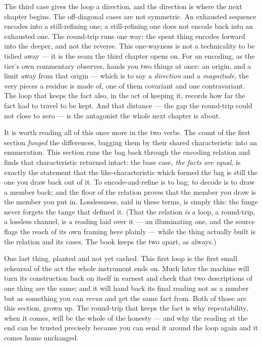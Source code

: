 The third case gives the loop a direction, and the direction is where the next chapter begins. The off-diagonal cases
are not symmetric. An exhausted sequence encodes into a still-refining one; a still-refining one does not encode back
into an exhausted one. The round-trip runs one way: the spent thing encodes forward into the deeper, and not the
reverse. This one-wayness is not a technicality to be tidied away --- it is the seam the third chapter opens on. For an
encoding, as the tier's own commentary observes, hands you two things at once: an origin, and a limit away from that
origin --- which is to say a \emph{direction} and a \emph{magnitude}, the very pieces a residue is made of, one of
them covariant and one contravariant. The loop that keeps the fact also, in the act of keeping it, records how far the
fact had to travel to be kept. And that distance --- the gap the round-trip could not close to zero --- is the
antagonist the whole next chapter is about.

It is worth reading all of this once more in the two verbs. The count of the first section \emph{funged} the
differences, bagging them by their shared characteristic into an enumeration. This section runs the bag back through
the encoding relation and finds that characteristic returned intact: the base case, \emph{the facts are equal}, is
exactly the statement that the like-characteristic which formed the bag is still the one you draw back out of it. To
encode-and-refine is to bag; to decode is to draw a member back; and the floor of the relation proves that the member
you draw is the member you put in. Losslessness, said in these terms, is simply this: the funge never forgets the
tange that defined it. (That the relation \emph{is} a loop, a round-trip, a lossless channel, is a reading laid over
it --- an illuminating one, and the source flags the reach of its own framing here plainly --- while the thing
actually built is the relation and its cases. The book keeps the two apart, as always.)

One last thing, planted and not yet cashed. This first loop is the first small rehearsal of the act the whole
instrument ends on. Much later the machine will turn its construction back on itself in earnest and check that two
descriptions of one thing are the same; and it will hand back its final reading not as a number but as something you
can \emph{rerun} and get the same fact from. Both of those are this section, grown up. The round-trip that keeps the
fact is why repeatability, when it comes, will be the whole of the honesty --- and why the reading at the end can be
trusted precisely because you can send it around the loop again and it comes home unchanged.
